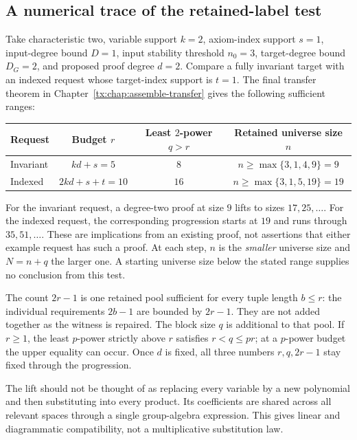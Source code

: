 \documentclass[11pt,a4paper,oneside,openany]{book}
\theoremstyle{definition}\newtheorem{definition}[theorem]{Definition}
\theoremstyle{remark}\newtheorem{remark}[theorem]{Remark}
\numberwithin{equation}{chapter}
\begin{document}
\subsection{A numerical trace of the retained-label test}
Take characteristic two, variable support $k=2$, axiom-index support
$s=1$, input-degree bound $D=1$, input stability threshold $n_0=3$,
target-degree bound $D_G=2$,
and proposed proof degree $d=2$. Compare a fully invariant target with
an indexed request whose target-index support is $t=1$.
The final transfer theorem in Chapter~\ref{tx:chap:assemble-transfer}
gives the following sufficient ranges:
\begin{center}
\begin{tabular}{@{}lccc@{}}
\toprule
Request & Budget $r$ & Least $2$-power $q>r$ & Retained universe size $n$\\
\midrule
Invariant & $kd+s=5$ & $8$ & $n\ge\max\{3,1,4,9\}=9$\\
Indexed & $2kd+s+t=10$ & $16$ & $n\ge\max\{3,1,5,19\}=19$\\
\bottomrule
\end{tabular}
\end{center}
For the invariant request, a degree-two proof at size $9$ lifts to
sizes $17,25,\ldots$. For the indexed request, the corresponding
progression starts at $19$ and runs through $35,51,\ldots$.
These are implications from an existing proof, not assertions that
either example request has such a proof. At each step, $n$ is the
\emph{smaller} universe size and $N=n+q$ the larger one. A starting universe size below
the stated range supplies no conclusion from this test.

The count $2r-1$ is one retained pool sufficient for every tuple
length $b\le r$: the individual requirements $2b-1$ are bounded by
$2r-1$. They are not added together as the witness is repaired.
The block size $q$ is additional to that pool. If $r\ge1$, the least
$p$-power strictly above $r$ satisfies $r<q\le pr$; at a $p$-power
budget the upper equality can occur. Once $d$ is fixed, all three
numbers $r,q,2r-1$ stay fixed through the progression.

The lift should not be thought of as replacing every variable by a new
polynomial and then substituting into every product. Its coefficients
are shared across all relevant spaces through a single group-algebra
expression. This gives linear and diagrammatic compatibility, not a
multiplicative substitution law.
\end{document}
